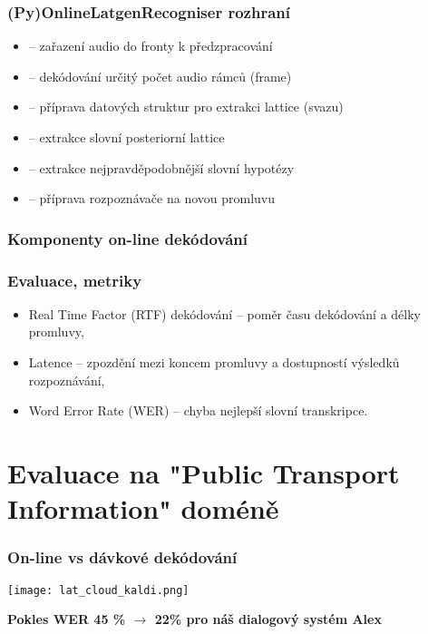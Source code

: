\begin{frame}\frametitle{(Py)OnlineLatgenRecogniser rozhraní} 
    \begin{itemize}
        \item {} -- zařazení audio do fronty k předzpracování
        \item {} -- dekódování určitý počet audio rámců (frame)
        \item {} -- příprava datových struktur pro extrakci lattice (svazu)
        \item {} -- extrakce slovní posteriorní lattice
        \item {} -- extrakce nejpravděpodobnější slovní hypotézy
        \item {} -- příprava rozpoznávače na novou promluvu
    \end{itemize}
\end{frame}

\begin{frame}\frametitle{Komponenty on-line dekódování} 
    \begin{center}
        
    \end{center}
\end{frame}


\begin{frame}\frametitle{Evaluace, metriky} 
    \begin{itemize}
        \item Real Time Factor (RTF) dekódování -- poměr času dekódování a délky promluvy,
        \item Latence -- zpozdění mezi koncem promluvy a dostupností výsledků rozpoznávání,
        \item Word Error Rate (WER) -- chyba nejlepší slovní transkripce.
    \end{itemize}
\end{frame}

\section[Evaluace na "PTI"]{Evaluace na "Public Transport Information" doméně}%

\begin{frame}\frametitle{On-line vs dávkové dekódování} 
    \begin{center}
        \texttt{[image: lat\_cloud\_kaldi.png]}
    \end{center}
    \bf {Pokles WER 45 \% $\longrightarrow$ 22\%} pro náš dialogový systém Alex
\end{frame}

